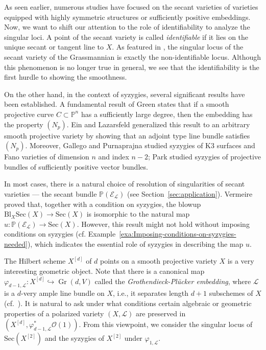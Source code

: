 \documentclass[a4paper]{amsart}
\numberwithin{equation}{section}
\theoremstyle{plain}
\theoremstyle{definition}
\theoremstyle{remark}
\numberwithin{figure}{section}
\numberwithin{table}{section}
\numberwithin{equation}{section}
\def \PP {\mathbb{P}}
\def \Ecal {\mathcal{E}}
\def \Lcal {\mathcal{L}}
\def \Ocal {\mathcal{O}}
\DeclareMathOperator{\Gr}{Gr}
\begin{document}
As seen earlier, numerous studies have focused on the secant varieties of varieties equipped with highly symmetric structures or sufficiently positive embeddings.
Now, we want to shift our attention to the role of identifiability to analyze the singular loci.
A point of the secant variety is called \textit{identifiable} if it lies on the unique secant or tangent line to $X$.
As featured in \cite{GS2022}, the singular locus of the secant variety of the Grassmannian is exactly the non-identifiable locus.
Although this phenomenon is no longer true in general, we see that the identifiability is the first hurdle to showing the smoothness.

On the other hand, in the context of syzygies, several significant results have been established.
A fundamental result of Green \cite{Green1984a, Green1984b} states that if a smooth projective curve $C \subset \PP^n$ has a sufficiently large degree, then the embedding has the property $(N_p)$.
Ein and Lazarsfeld \cite{EL1993} generalized this result to an arbitrary smooth projective variety by showing that an adjoint type line bundle satisfies $(N_p)$.
Moreover, Gallego and Purnaprajna \cite{GP2000} studied syzygies of K3 surfaces and Fano varieties of dimension $n$ and index $n-2$; Park \cite{Park2007} studied syzygies of projective bundles of sufficiently positive vector bundles.

In most cases, there is a natural choice of resolution of singularities of secant varieties --- the secant bundle $\PP(\Ecal_{\Lcal})$ (see Section~\ref{sec:application}).
Vermeire \cite{Vermeire2001} proved that, together with a condition on syzygies, the blowup $\mathrm{Bl}_X \mathrm{Sec}(X) \rightarrow \mathrm{Sec}(X)$ is isomorphic to the natural map $u:\PP(\Ecal_{\Lcal}) \rightarrow \mathrm{Sec}(X)$.
However, this result might not hold without imposing conditions on syzygies (cf. Example~\ref{exa:Imposing-conditions-on-syzygies-needed}), which indicates the essential role of syzygies in describing the map $u$.

The Hilbert scheme $X^{[d]}$ of $d$ points on a smooth projective variety $X$ is a very interesting geometric object.
Note that there is a canonical map $\varphi_{d-1,\Lcal}: X^{[d]} \hookrightarrow \Gr(d,V)$ called the \textit{Grothendieck-Pl\"ucker embedding}, where $\Lcal$ is a $d$-very ample line bundle on $X$, i.e., it separates length $d+1$ subschemes of $X$ (cf.~\cite[Main~Theorem]{CG1990}).
It is natural to ask under what conditions certain algebraic or geometric properties of a polarized variety $(X, \Lcal)$ are preserved in $(X^{[d]}, \varphi_{d-1,\Lcal}^{\ast} \Ocal(1))$.
From this viewpoint, we consider the singular locus of $\mathrm{Sec}(X^{[2]})$ and the syzygies of $X^{[2]}$ under $\varphi_{1,\Lcal}$.
\end{document}
